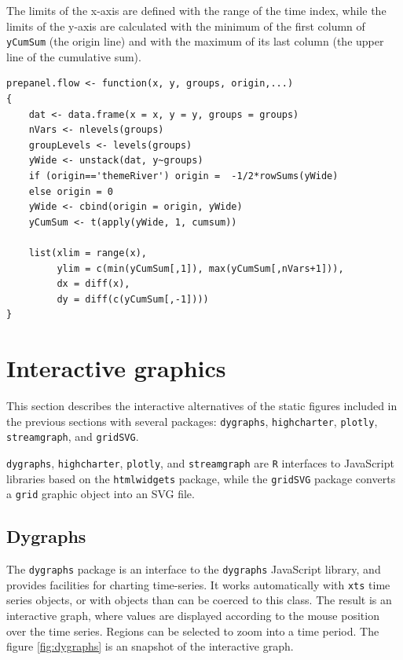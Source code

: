 The limits of the x-axis are defined with the range of the time index,
while the limits of the y-axis are calculated with the minimum of the
first column of \texttt{yCumSum} (the origin line) and with the maximum of
its last column (the upper line of the cumulative sum).

\lstset{language=r,label= ,caption= ,captionpos=b,numbers=none}
\begin{lstlisting}
prepanel.flow <- function(x, y, groups, origin,...)
{
    dat <- data.frame(x = x, y = y, groups = groups)
    nVars <- nlevels(groups)
    groupLevels <- levels(groups)
    yWide <- unstack(dat, y~groups)
    if (origin=='themeRiver') origin =  -1/2*rowSums(yWide)
    else origin = 0
    yWide <- cbind(origin = origin, yWide)
    yCumSum <- t(apply(yWide, 1, cumsum))
    
    list(xlim = range(x),
         ylim = c(min(yCumSum[,1]), max(yCumSum[,nVars+1])),
         dx = diff(x),
         dy = diff(c(yCumSum[,-1])))
}
\end{lstlisting}


\section{Interactive graphics \label{sec:interactive_horizontal}}
\label{sec:org9f3eb2d}
This section describes the interactive alternatives of the static
figures included in the previous sections with several packages:
\texttt{dygraphs}, \texttt{highcharter}, \texttt{plotly}, \texttt{streamgraph}, and \texttt{gridSVG}.

\texttt{dygraphs}, \texttt{highcharter}, \texttt{plotly}, and \texttt{streamgraph} are \texttt{R} interfaces to
JavaScript libraries based on the \texttt{htmlwidgets} package, while the
\texttt{gridSVG} package converts a \texttt{grid} graphic object into an SVG file.

\subsection{Dygraphs \label{sec:dygraphs}}
\label{sec:org0ba4b77}
The \texttt{dygraphs} package is an interface to the \texttt{dygraphs} JavaScript
library, and provides facilities for charting time-series. It works
automatically with \texttt{xts} time series objects, or with objects than can
be coerced to this class. The result is an interactive graph, where
values are displayed according to the mouse position over the time
series. Regions can be selected to zoom into a time period. The figure
\ref{fig:dygraphs} is an snapshot of the interactive graph.

